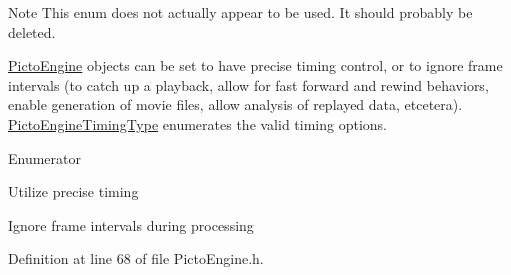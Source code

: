 \begin{DoxyNote}{Note}
This enum does not actually appear to be used. It should probably be deleted.
\end{DoxyNote}
\hyperlink{class_picto_1_1_engine_1_1_picto_engine}{Picto\-Engine} objects can be set to have precise timing control, or to ignore frame intervals (to catch up a playback, allow for fast forward and rewind behaviors, enable generation of movie files, allow analysis of replayed data, etcetera). \hyperlink{namespace_picto_1_1_engine_1_1_picto_engine_timing_type}{Picto\-Engine\-Timing\-Type} enumerates the valid timing options. \begin{Desc}
\item[Enumerator]\par
\begin{description}
\item[{\em 
\hypertarget{namespace_picto_1_1_engine_1_1_picto_engine_timing_type_a3b9833c69033de872a089c4c79a7496ca53ec905db7963529412112d01a663492}{precise}\label{namespace_picto_1_1_engine_1_1_picto_engine_timing_type_a3b9833c69033de872a089c4c79a7496ca53ec905db7963529412112d01a663492}
}]Utilize precise timing \item[{\em 
\hypertarget{namespace_picto_1_1_engine_1_1_picto_engine_timing_type_a3b9833c69033de872a089c4c79a7496ca3c573955bb912e564ac0a7ce0983ef38}{ignore\-Frame\-Intervals}\label{namespace_picto_1_1_engine_1_1_picto_engine_timing_type_a3b9833c69033de872a089c4c79a7496ca3c573955bb912e564ac0a7ce0983ef38}
}]Ignore frame intervals during processing \end{description}
\end{Desc}


Definition at line 68 of file Picto\-Engine.\-h.

